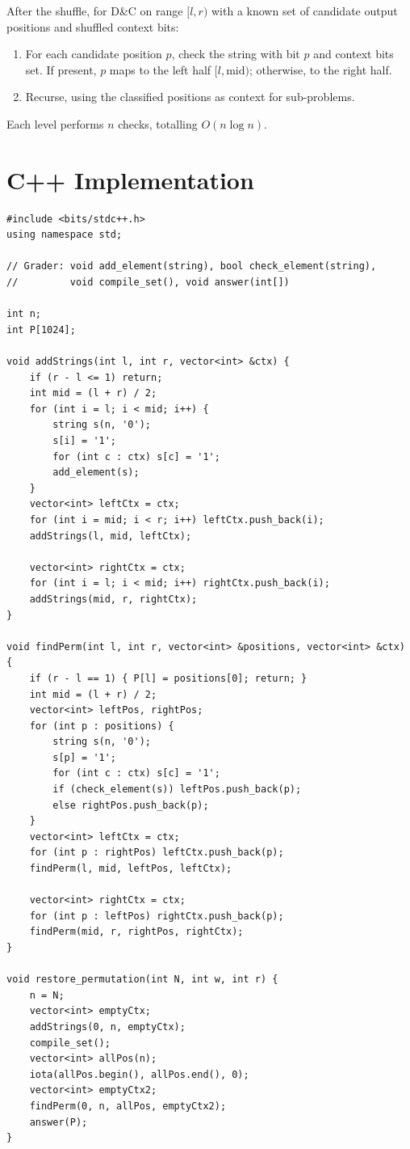 \documentclass[11pt,a4paper]{article}
\begin{document}
After the shuffle, for D\&C on range $[l, r)$ with a known set of candidate output positions and shuffled context bits:
\begin{enumerate}
  \item For each candidate position $p$, check the string with bit $p$ and context bits set. If present, $p$ maps to the left half $[l, \text{mid})$; otherwise, to the right half.
  \item Recurse, using the classified positions as context for sub-problems.
\end{enumerate}

Each level performs $n$ checks, totalling $O(n \log n)$.

\section{C++ Implementation}

\begin{lstlisting}
#include <bits/stdc++.h>
using namespace std;

// Grader: void add_element(string), bool check_element(string),
//         void compile_set(), void answer(int[])

int n;
int P[1024];

void addStrings(int l, int r, vector<int> &ctx) {
    if (r - l <= 1) return;
    int mid = (l + r) / 2;
    for (int i = l; i < mid; i++) {
        string s(n, '0');
        s[i] = '1';
        for (int c : ctx) s[c] = '1';
        add_element(s);
    }
    vector<int> leftCtx = ctx;
    for (int i = mid; i < r; i++) leftCtx.push_back(i);
    addStrings(l, mid, leftCtx);

    vector<int> rightCtx = ctx;
    for (int i = l; i < mid; i++) rightCtx.push_back(i);
    addStrings(mid, r, rightCtx);
}

void findPerm(int l, int r, vector<int> &positions, vector<int> &ctx) {
    if (r - l == 1) { P[l] = positions[0]; return; }
    int mid = (l + r) / 2;
    vector<int> leftPos, rightPos;
    for (int p : positions) {
        string s(n, '0');
        s[p] = '1';
        for (int c : ctx) s[c] = '1';
        if (check_element(s)) leftPos.push_back(p);
        else rightPos.push_back(p);
    }
    vector<int> leftCtx = ctx;
    for (int p : rightPos) leftCtx.push_back(p);
    findPerm(l, mid, leftPos, leftCtx);

    vector<int> rightCtx = ctx;
    for (int p : leftPos) rightCtx.push_back(p);
    findPerm(mid, r, rightPos, rightCtx);
}

void restore_permutation(int N, int w, int r) {
    n = N;
    vector<int> emptyCtx;
    addStrings(0, n, emptyCtx);
    compile_set();
    vector<int> allPos(n);
    iota(allPos.begin(), allPos.end(), 0);
    vector<int> emptyCtx2;
    findPerm(0, n, allPos, emptyCtx2);
    answer(P);
}
\end{lstlisting}
\end{document}
